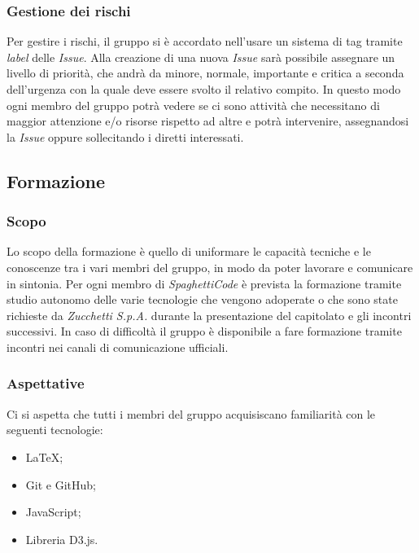 \subsubsection{Gestione dei rischi}

Per gestire i rischi, il gruppo si è accordato nell'usare un sistema di tag tramite \emph{label} delle \emph{Issue}.
Alla creazione di una nuova \emph{Issue} sarà possibile assegnare un livello di priorità, che andrà da minore, normale,
importante e critica a seconda dell'urgenza con la quale deve essere svolto il relativo compito. In questo modo ogni
membro del gruppo potrà vedere se ci sono attività che necessitano di maggior attenzione e/o risorse rispetto ad altre
e potrà intervenire, assegnandosi la \emph{Issue} oppure sollecitando i diretti interessati.

\subsection{Formazione}

\subsubsection{Scopo}

Lo scopo della formazione è quello di uniformare le capacità tecniche e le conoscenze tra i vari membri del gruppo, in modo da poter
lavorare e comunicare in sintonia. Per ogni membro di \emph{SpaghettiCode} è prevista la formazione tramite studio autonomo delle varie
tecnologie che vengono adoperate o che sono state richieste da \emph{Zucchetti S.p.A.} durante la presentazione del capitolato e gli
incontri successivi. In caso di difficoltà il gruppo è disponibile a fare formazione tramite incontri nei canali di comunicazione ufficiali.

\subsubsection{Aspettative}

Ci si aspetta che tutti i membri del gruppo acquisiscano familiarità con le seguenti tecnologie:
\begin{itemize}
    \item \LaTeX;
    \item Git e GitHub;
    \item JavaScript;
    \item Libreria D3.js.
\end{itemize}
